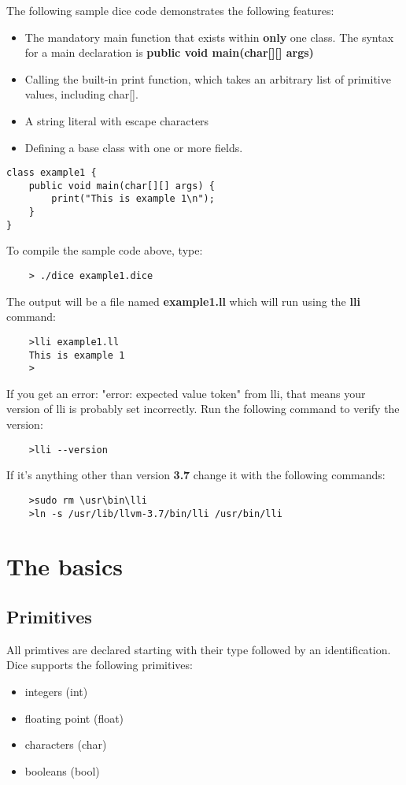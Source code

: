 \begin{homeworkProblem}
	The following sample dice code demonstrates the following features:
	\begin{itemize}
		\item The mandatory main function that exists within \textbf{only} one class. The syntax for a main declaration is \textbf{public void main(char[][] args)}
		\item Calling the built-in print function, which takes an arbitrary list of primitive values, including char[]. 
		\item A string literal with escape characters
		\item Defining a base class with one or more fields. 
	\end{itemize}
	\begin{verbatim}
class example1 {
	public void main(char[][] args) {
		print("This is example 1\n");
	}
}
	\end{verbatim}
	To compile the sample code above, type:
	\begin{verbatim}
	> ./dice example1.dice
	\end{verbatim}
	The output will be a file named \textbf{example1.ll} which will run using the \textbf{lli} command:
	\begin{verbatim}
	>lli example1.ll
	This is example 1
	>
	\end{verbatim}
	If you get an error: "error: expected value token" from lli, that means your version of lli is probably set incorrectly. Run the following command to verify the version:
	\begin{verbatim}
	>lli --version
	\end{verbatim}
	If it's anything other than version \textbf{3.7} change it with the following commands:
	\begin{verbatim}
	>sudo rm \usr\bin\lli
	>ln -s /usr/lib/llvm-3.7/bin/lli /usr/bin/lli
	\end{verbatim}

	\pagebreak
	\section{The basics}
	\subsection{Primitives}
	All primtives are declared starting with their type followed by an identification. Dice supports the following primitives:
	\begin{itemize}
		\item integers (int)
		\item floating point (float)
		\item characters (char)
		\item booleans (bool)
	\end{itemize}


\end{homeworkProblem}
